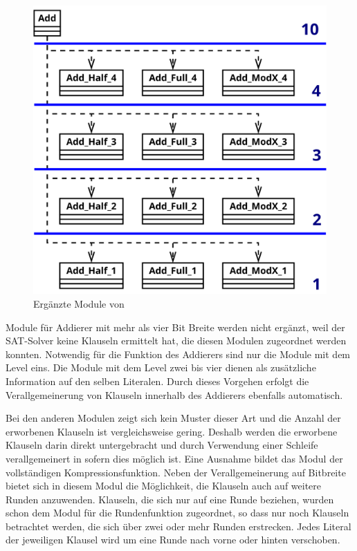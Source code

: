 \begin{figure}[!h]
  \centering
  \includegraphics[scale=0.265]{images/module_add}
  \caption{Ergänzte Module von }
  \label{fig:sha256_module_add}
\end{figure}

Module für Addierer mit mehr als vier Bit Breite werden nicht ergänzt, weil der SAT-Solver keine Klauseln ermittelt hat, die diesen Modulen zugeordnet werden konnten.  
Notwendig für die Funktion des Addierers sind nur die Module mit dem Level eins. Die Module mit dem Level zwei bis vier dienen als zusätzliche Information
auf den selben Literalen. Durch dieses Vorgehen erfolgt die Verallgemeinerung von Klauseln innerhalb des Addierers ebenfalls automatisch.

Bei den anderen Modulen zeigt sich kein Muster dieser Art und die Anzahl der erworbenen Klauseln ist vergleichsweise gering. Deshalb werden die erworbene Klauseln
darin direkt untergebracht und durch Verwendung einer Schleife verallgemeinert in sofern dies möglich ist. Eine Ausnahme bildet das Modul der vollständigen
Kompressionsfunktion. Neben der Verallgemeinerung auf Bitbreite bietet sich in diesem Modul die Möglichkeit, die Klauseln auch auf weitere Runden anzuwenden.
Klauseln, die sich nur auf eine Runde beziehen, wurden schon dem Modul für die Rundenfunktion zugeordnet, so dass nur noch Klauseln betrachtet werden, die sich über
zwei oder mehr Runden erstrecken. Jedes Literal der jeweiligen Klausel wird um eine Runde nach vorne oder hinten verschoben.

